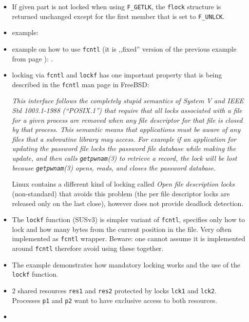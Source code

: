 \begin{itemize}
\item If given part is not locked when using \texttt{F\_GETLK},
the \texttt{flock} structure is returned unchanged except for the first member
that is set to \texttt{F\_UNLCK}.
\item {} example: 
\item {} example on how to use \texttt{fcntl} (it is
,,fixed'' version of the previous  example from page
\pageref{RACE_C}): .
\item locking via \texttt{fcntl} and \texttt{lockf} has one important property
that is being described in the \texttt{fcntl} man page in FreeBSD:

\emph{This interface follows the completely stupid semantics of System V
and IEEE Std 1003.1-1988 (``POSIX.1'') that require that all locks
associated with a file for a given process are removed when any file
descriptor for that file is closed by that process. This semantic
means that applications must be aware of any files that a subroutine
library may access. For example if an application for updating the
password file locks the password file database while making the
update, and then calls \texttt{getpwnam}(3) to retrieve a record,
the lock will be lost because \texttt{getpwnam}(3) opens, reads, and
closes the password database.}

Linux contains a different kind of locking called \emph{Open file description
locks} (non-standard) that avoids this problem (the per file descriptor locks
are released only on the last close), however does not provide deadlock
detection.
\item The \texttt{lockf} function (SUSv3) is simpler variant of
\texttt{fcntl}, specifies only how to lock and how many bytes from the current
position in the file. Very often implemented as \texttt{fcntl} wrapper.
Beware: one cannot assume it is implemented around \texttt{fcntl} therefore
avoid using these together.
\item The example  demonstrates how mandatory
locking works and the use of the \texttt{lockf} function.
\end{itemize}




\begin{slide}
\begin{itemize}
\item 2 shared resources \texttt{res1} and \texttt{res2} protected by locks
\texttt{lck1} and \texttt{lck2}. Processes \texttt{p1} and
\texttt{p2} want to have exclusive access to both resources.
\end{itemize}
\begin{center}

\end{center}
\begin{itemize}
\item {}
\end{itemize}
\end{slide}

